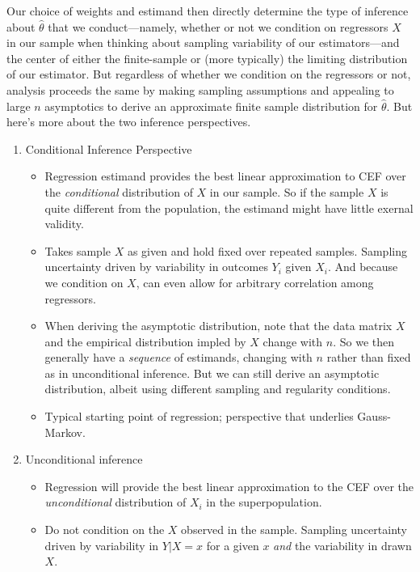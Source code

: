 \documentclass[12pt]{article}
\theoremstyle{plain}
\theoremstyle{definition}
\theoremstyle{remark}
\begin{document}
\begin{enumerate}
    Our choice of weights and estimand then directly determine the type
    of inference about $\hat{\theta}$ that we conduct---namely,
    whether or not we condition on regressors $X$ in our
    sample when thinking about sampling variability of our
    estimators---and the center of either the finite-sample or (more
    typically) the limiting distribution of our estimator.
    But regardless of whether we condition on the regressors or not,
    analysis proceeds the same by making sampling assumptions and
    appealing to large $n$ asymptotics to derive an approximate finite
    sample distribution for $\hat{\theta}$.
    But here's more about the two inference perspectives.
    \begin{enumerate}[label=(\alph*)]
      \item Conditional Inference Perspective
        \begin{itemize}
          \item Regression estimand provides the best linear
            approximation to CEF over the \emph{conditional}
            distribution of $X$ in our sample.
            So if the sample $X$ is quite different from the population,
            the estimand might have little exernal validity.

          \item Takes sample $X$ as given and hold fixed over repeated
            samples.
            Sampling uncertainty driven by variability in outcomes
            $Y_i$ given $X_i$.
            And because we condition on $X$, can even allow for
            arbitrary correlation among regressors.

          \item
            When deriving the asymptotic distribution, note that the
            data matrix $X$ and the empirical distribution impled by $X$
            change with $n$.
            So we then generally have a \emph{sequence}
            of estimands, changing with $n$ rather than fixed as in
            unconditional inference.
            But we can still derive an asymptotic distribution, albeit
            using different sampling and regularity conditions.

          \item Typical starting point of regression; perspective
            that underlies Gauss-Markov.

        \end{itemize}

      \item Unconditional inference
        \begin{itemize}
          \item Regression will provide the best linear approximation to
            the CEF over the \emph{unconditional} distribution of $X_i$
            in the superpopulation.
          \item Do not condition on the $X$ observed in the
            sample.
            Sampling uncertainty driven by variability in $Y|X=x$
            for a given $x$ \emph{and} the variability in drawn $X$.
        \end{itemize}
    \end{enumerate}


\end{enumerate}
\end{document}
